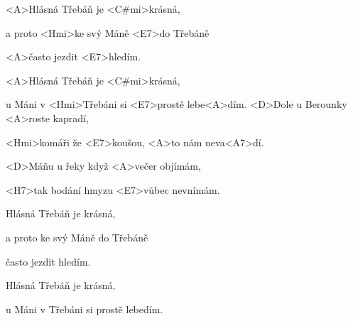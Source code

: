
\zr
<A>Hlásná Třebáň je <C#mi>krásná,

a proto <Hmi>ke svý Máně <E7>do Třebáně

<A>často jezdit <E7>hledím.

<A>Hlásná Třebáň je <C#mi>krásná,

u Máni v <Hmi>Třebáni si <E7>prostě lebe<A>dím.
\kr
\zs
<D>Dole u Berounky <A>roste kapradí,

<Hmi>komáři že <E7>koušou, <A>to nám neva<A7>dí.

<D>Máňu u řeky když <A>večer objímám,

<H7>tak bodání hmyzu <E7>vůbec nevnímám. \ks

\zr
Hlásná Třebáň je krásná,

a proto ke svý Máně do Třebáně 

často jezdit hledím. 

Hlásná Třebáň je krásná, 

u Máni v Třebáni si prostě lebedím.
\kr
\kp


